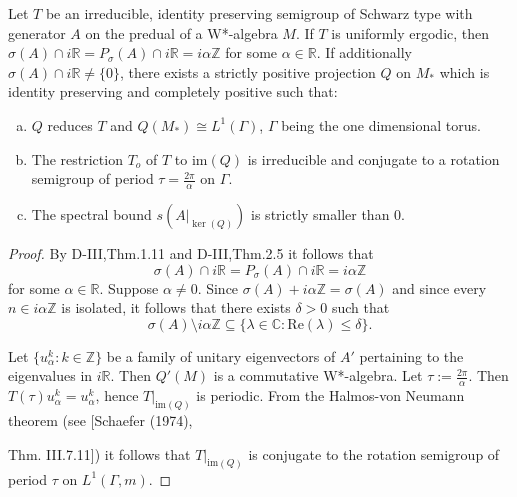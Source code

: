 \begin{proposition}\label{prop:d4-3-10}
Let \(T\) be an irreducible, identity preserving semigroup of Schwarz type with generator \(A\) on the predual of a W*-algebra \(M\).
If \(T\) is uniformly ergodic, then \(\sigma(A) \cap i\mathbb{R} = P_{\sigma}(A) \cap i\mathbb{R} = i\alpha\mathbb{Z}\) for some \(\alpha \in \mathbb{R}\).
If additionally \(\sigma(A) \cap i\mathbb{R} \neq \{0\}\), there exists a strictly positive projection \(Q\) on \(M_{*}\) which is identity preserving and completely positive such that:
\begin{enumerate}[(a)]
\item
\(Q\) reduces \(T\) and \(Q(M_{*}) \cong L^{1}(\Gamma)\), \(\Gamma\) being the one dimensional torus.

\item
The restriction \(T_{o}\) of \(T\) to \(\text{im}(Q)\) is irreducible and conjugate to a rotation semigroup of period \(\tau = \frac{2\pi}{\alpha}\) on \(\Gamma\).

\item
The spectral bound \(s(A|_{\ker(Q)})\) is strictly smaller than \(0\).
\end{enumerate}
\end{proposition}


\begin{proof}
By D-III,Thm.1.11 and D-III,Thm.2.5 it follows that
\[
\sigma(A) \cap i\mathbb{R} = P_{\sigma}(A) \cap i\mathbb{R} = i\alpha\mathbb{Z}
\]
for some \(\alpha \in \mathbb{R}\).
Suppose \(\alpha \neq 0\).
Since \(\sigma(A) + i\alpha\mathbb{Z} = \sigma(A)\) and since every \(n \in i\alpha\mathbb{Z}\) is isolated, it follows that there exists \(\delta > 0\) such that
\[
\sigma(A) \setminus i\alpha\mathbb{Z} \subseteq \{\lambda \in \mathbb{C}: \text{Re}(\lambda) \leq \delta\}.
\]

Let \(\{u_{\alpha}^{k}: k \in \mathbb{Z}\}\) be a family of unitary eigenvectors of \(A'\) pertaining to the eigenvalues in \(i\mathbb{R}\).
Then \(Q'(M)\) is a commutative W*-algebra.
Let \(\tau := \frac{2\pi}{\alpha}\).
Then \(T(\tau)u_{\alpha}^{k} = u_{\alpha}^{k}\), hence \(T|_{\text{im}(Q)}\) is periodic.
From the Halmos-von Neumann theorem (see [Schaefer (1974),

\newpage

Thm. III.7.11]) it follows that \(T|_{\text{im}(Q)}\) is conjugate to the rotation semigroup of period \(\tau\) on \(L^{1}(\Gamma,m)\).
\end{proof}

